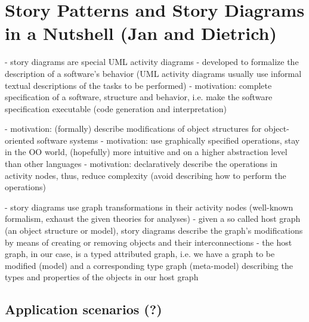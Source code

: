 \section{Story Patterns and Story Diagrams in a Nutshell (Jan and Dietrich)} \label{sec:Overview}


- story diagrams are special UML activity diagrams
- developed to formalize the description of a software's behavior (UML activity diagrams usually use informal textual descriptions of the tasks to be performed)
- motivation: complete specification of a software, structure and behavior, i.e. make the software specification executable (code generation and interpretation)

- motivation: (formally) describe modifications of object structures for object-oriented software systems
- motivation: use graphically specified operations, stay in the OO world, (hopefully) more intuitive and on a higher abstraction level than other languages
- motivation: declaratively describe the operations in activity nodes, thus, reduce complexity (avoid describing how to perform the operations)

- story diagrams use graph transformations in their activity nodes (well-known formalism, exhaust the given theories for analyses)
- given a so called host graph (an object structure or model), story diagrams describe the graph's modifications by means of creating or removing objects and their interconnections
- the host graph, in our case, is a typed attributed graph, i.e. we have a graph to be modified (model) and a corresponding type graph (meta-model) describing the types and properties of the objects in our host graph






\subsection{Application scenarios (?)} \label{sec:Applications}